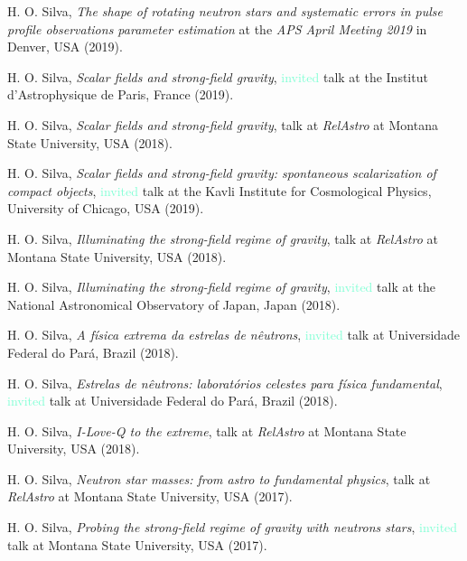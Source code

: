 \documentclass[10pt]{article}
\begin{document}
\begin{bibenum}
    \item H. O. Silva,
    \emph{The shape of rotating neutron stars and systematic errors
          in pulse profile observations parameter estimation}
    at the \emph{APS April Meeting 2019}
    in Denver, USA (2019).

    \item H. O. Silva,
    \emph{Scalar fields and strong-field gravity},
    \textcolor{Aquamarine}{invited} talk at the Institut d'Astrophysique de Paris, France (2019).

    \item H. O. Silva,
    \emph{Scalar fields and strong-field gravity},
    talk at \emph{RelAstro} at Montana State University, USA (2018).

	\item H. O. Silva,
    \emph{Scalar fields and strong-field gravity: spontaneous scalarization of compact objects},
    \textcolor{Aquamarine}{invited} talk at the Kavli Institute for Cosmological Physics, University of Chicago, USA (2019).

    \item H. O. Silva,
    \emph{Illuminating the strong-field regime of gravity},
    talk at \emph{RelAstro} at Montana State University, USA (2018).

	\item H. O. Silva,
    \emph{Illuminating the strong-field regime of gravity},
    \textcolor{Aquamarine}{invited} talk at the National Astronomical Observatory of Japan, Japan (2018).

    \item H. O. Silva,
    \emph{A f\'isica extrema da estrelas de n\^eutrons},
    \textcolor{Aquamarine}{invited} talk at Universidade Federal do Par\'a, Brazil (2018).

    \item H. O. Silva,
    \emph{Estrelas de n\^eutrons: laborat\'orios celestes para f\'isica fundamental},
    \textcolor{Aquamarine}{invited} talk at Universidade Federal do Par\'a, Brazil (2018).

    \item H. O. Silva,
    \emph{I-Love-Q to the extreme},
    talk at \emph{RelAstro} at Montana State University, USA (2018).

    \item H. O. Silva,
    \emph{Neutron star masses: from astro to fundamental physics},
    talk at \emph{RelAstro} at Montana State University, USA (2017).

    \item H. O. Silva,
    \emph{Probing the strong-field regime of gravity with neutrons stars},
    \textcolor{Aquamarine}{invited} talk at Montana State University, USA (2017).


\end{bibenum}
\end{document}
